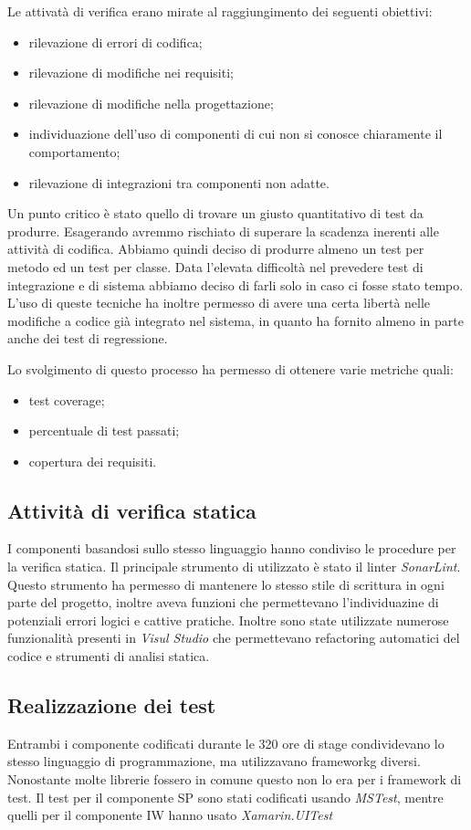 Le attivatà di verifica erano mirate al raggiungimento dei seguenti obiettivi: 
\begin{itemize}
    \item rilevazione di errori di codifica;
    \item rilevazione di modifiche nei requisiti;
    \item rilevazione di modifiche nella progettazione;
    \item individuazione dell’uso di componenti di cui non si conosce chiaramente il comportamento;
    \item rilevazione di integrazioni tra componenti non adatte.
\end{itemize}
\medskip
Un punto critico è stato quello di trovare un giusto quantitativo di test da produrre. Esagerando avremmo rischiato di superare la scadenza inerenti alle attività di codifica.
Abbiamo quindi deciso di produrre almeno un test per metodo ed un test per classe. 
Data l’elevata difficoltà nel prevedere test di integrazione e di sistema abbiamo deciso di farli solo in caso ci fosse stato tempo. 
L'uso di queste tecniche ha inoltre permesso di avere una certa libertà nelle modifiche a codice già integrato nel sistema, in quanto ha fornito almeno in parte anche dei test di regressione. 

Lo svolgimento di questo processo ha permesso di ottenere varie metriche quali:
\begin{itemize}
    \item test coverage;
    \item percentuale di test passati;
    \item copertura dei requisiti.
\end{itemize}

\subsection{Attività di verifica statica}
I componenti basandosi sullo stesso linguaggio hanno condiviso le procedure per la verifica statica. Il principale strumento di utilizzato è stato il linter \emph{SonarLint}. Questo strumento ha permesso di mantenere lo stesso stile di scrittura in ogni parte del progetto, inoltre aveva funzioni che permettevano l'individuazine di potenziali errori logici e cattive pratiche. 
Inoltre sono state utilizzate numerose funzionalità presenti in \emph{Visul Studio} che permettevano refactoring automatici del codice e strumenti di analisi statica.

\subsection{Realizzazione dei test}
Entrambi i componente codificati durante le 320 ore di stage condividevano lo stesso linguaggio di programmazione, ma utilizzavano \gls{frameworkg} diversi. Nonostante molte librerie fossero in comune questo non lo era per i framework di test. Il test per il componente SP sono stati codificati usando \emph{MSTest}, mentre quelli per il componente IW hanno usato \emph{Xamarin.UITest}

